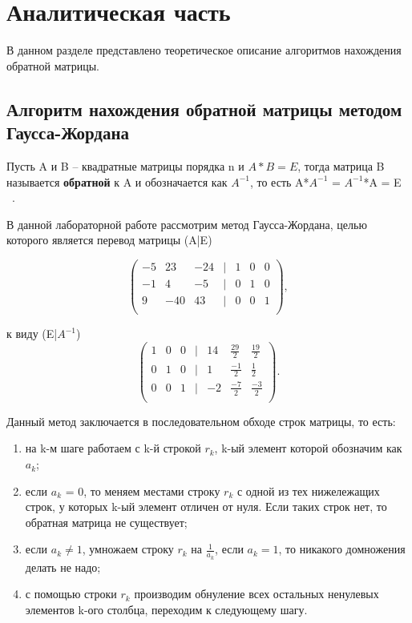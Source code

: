 \chapter{Аналитическая часть}
В данном разделе представлено теоретическое описание алгоритмов нахождения обратной матрицы.


\section{Алгоритм нахождения обратной матрицы методом Гаусса-Жордана}

Пусть A и B -- квадратные матрицы порядка n и $A*B = E$, тогда матрица B называется 
\textbf{обратной} к A и обозначается как $A^{-1}$, то есть A*$A^{-1}$ = $A^{-1}$*A = E ~\cite{matrix}.

В данной лабораторной работе рассмотрим метод Гаусса-Жордана, целью которого является перевод 
матрицы (A|E) 

\begin{equation}
    \begin{pmatrix}
            -5 & 23 & -24 & \mid & 1 & 0 & 0\\
            -1 & 4 & -5 & \mid & 0 & 1 & 0\\
            9 & -40 & 43 & \mid & 0 & 0 & 1\\
    \end{pmatrix},
\end{equation}

к виду (E|$A^{-1}$)
\begin{equation}
    \begin{pmatrix}
            1 & 0 & 0 & \mid & 14 & \frac{29}{2} & \frac{19}{2} \\
            0 & 1 & 0 & \mid & 1 & \frac{-1}{2}  & \frac{1}{2} \\
            0 & 0 & 1 & \mid & -2 & \frac{-7}{2}  & \frac{-3}{2} \\
    \end{pmatrix}.
\end{equation}

Данный метод заключается в последовательном обходе строк матрицы, то есть:
\begin{enumerate}
    \item на k-м шаге работаем с k-й строкой $r_{k}$, k-ый элемент которой обозначим как $a_{k}$;
    \item если $a_{k}$ = 0, то меняем местами строку $r_{k}$ с одной из тех нижележащих строк, у которых 
    k-ый элемент отличен от нуля. Если таких строк нет, то обратная матрица не существует;
    \item если $a_{k} \neq 1$, умножаем строку $r_{k}$ на $\frac{1}{a_{k}}$, если $a_{k} = 1$, 
    то никакого домножения делать не надо;
    \item с помощью строки $r_{k}$ производим обнуление всех остальных ненулевых элементов k-ого столбца, 
    переходим к следующему шагу.
\end{enumerate} 

